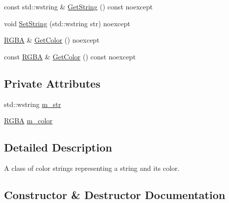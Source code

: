\begin{DoxyCompactItemize}
\item 
const std\+::wstring \& \mbox{\hyperlink{classmage_1_1rendering_1_1_color_string_a953db2aabafa120aab206e1295f92992}{Get\+String}} () const noexcept
\item 
void \mbox{\hyperlink{classmage_1_1rendering_1_1_color_string_a3f5139de7675dc21f4f444fae8a1983d}{Set\+String}} (std\+::wstring str) noexcept
\item 
\mbox{\hyperlink{structmage_1_1_r_g_b_a}{R\+G\+BA}} \& \mbox{\hyperlink{classmage_1_1rendering_1_1_color_string_a396ed7da3f3b27068b05c1ead9816046}{Get\+Color}} () noexcept
\item 
const \mbox{\hyperlink{structmage_1_1_r_g_b_a}{R\+G\+BA}} \& \mbox{\hyperlink{classmage_1_1rendering_1_1_color_string_a08bd67511180f15e902ce34dd402fe82}{Get\+Color}} () const noexcept
\end{DoxyCompactItemize}
\subsection*{Private Attributes}
\begin{DoxyCompactItemize}
\item 
std\+::wstring \mbox{\hyperlink{classmage_1_1rendering_1_1_color_string_af19cfa7bbdd66a1f83dd44dd9533f5ed}{m\+\_\+str}}
\item 
\mbox{\hyperlink{structmage_1_1_r_g_b_a}{R\+G\+BA}} \mbox{\hyperlink{classmage_1_1rendering_1_1_color_string_a6b062bfa44b3786c5e8f2e8d18a373ca}{m\+\_\+color}}
\end{DoxyCompactItemize}


\subsection{Detailed Description}
A class of color strings representing a string and its color. 

\subsection{Constructor \& Destructor Documentation}
\mbox{\label{classmage_1_1rendering_1_1_color_string_abac2eac876023c3e4d5d4b28c0f72933}} 
